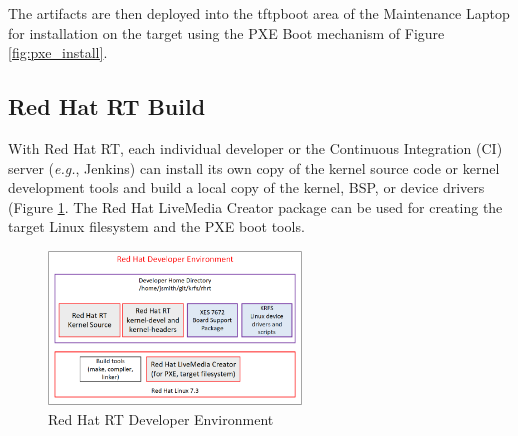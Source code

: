 \documentclass[12pt]{article}
\begin{document}
\begin{table}[H]
    \captionsetup{width=0.9\linewidth}
    \caption{Artifacts created with RedHawk Architect}
    \label{tab:architect_artifacts}
\end{table}

The artifacts are then deployed into the tftpboot area of the Maintenance
Laptop for installation on the target using the PXE Boot mechanism of Figure
\ref{fig:pxe_install}.


%
\subsection{Red Hat RT Build}

With Red Hat RT, each individual developer or the Continuous Integration (CI)
server (\textit{e.g.}, Jenkins) can install its own copy of the kernel source
code or kernel development tools and build a local copy of the kernel, BSP, or
device drivers (Figure \ref{fig:red_hat_dev}.  The Red Hat LiveMedia Creator
package can be used for creating the target Linux filesystem and the PXE boot
tools.

\begin{figure}[H]
    \begin{center}
    \includegraphics[width=0.6\textwidth]{img/red_hat_dev}
    \caption{Red Hat RT Developer Environment}
    \label{fig:red_hat_dev}
    \end{center}
\end{figure}
\end{document}
